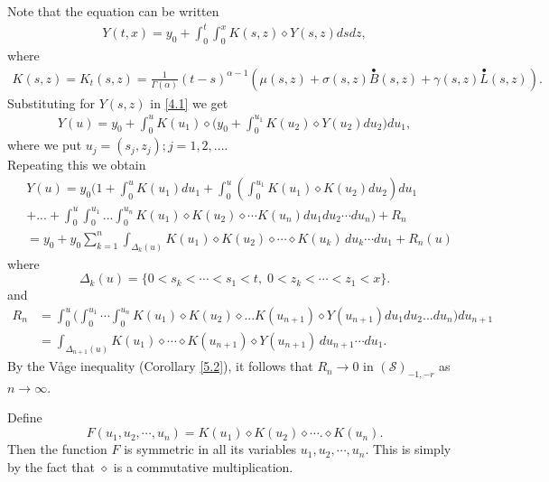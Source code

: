 \documentclass[12pt]{article}%
\numberwithin{equation}{section}
\def\d{\diamond}
\def\d{\diamond}
\begin{document}
Note that the equation can be written
\begin{align}
Y(t,x)=y_0 + \int_0^t \int_0^x K(s,z) \diamond Y(s,z) ds dz, \label{4.1}
\end{align}
where
\begin{align}
K(s,z)=K_t(s,z)=\frac{1}{\Gamma(\alpha)}(t-s)^{\alpha -1}(\mu(s,z) +\sigma(s,z)\overset{\bullet}{B}(s,z)  + \gamma(s,z) \overset{\bullet}{L}(s,z)).\label{4.2}
\end{align}
Substituting for $Y(s,z)$ in \eqref{4.1} we get
\begin{align*}
Y(u)= y_0 + \int_0^{u} K(u_1) \d \big(y_0+ \int_0^{u_1}K(u_2)\d Y(u_2)du_2\big)du_1,
\end{align*}
where we put  $u_j=(s_j,z_j); j=1,2, ...$.\\ 
Repeating this we obtain
\begin{align}
&Y(u)=y_0\Big( 1 + \int_0^{u} K(u_1)du_1 + \int_0^{u} (\int_0^{u_1} K(u_1) \d K(u_2)du_2 ) du_1 \nonumber\\
& +  ... + \int_0^{u}  \int_0^{u_1} ... \int_0^{u_n} K(u_1)\d K(u_2) \d \cdots K(u_{n}) du_1 du_2 \cdots du_n) +R_{n} \label{4.5}\\
&=y_0
+y_0
\sum_{k=1}^{n}
\int_{\Delta_k(u)}
K(u_1)\diamond K(u_2)\diamond\cdots\diamond K(u_k)
\,du_k\cdots du_1
+
R_n(u)
\end{align}
where
\[
\Delta_k(u)
=
\{0<s_k<\cdots<s_1<t,\; 0<z_k<\cdots<z_1<x\}.
\]
and 
\begin{align}
R_{n}&= \int_0^{u} \big( \int_0^{u_1}\cdots \int_0^{u_n} K(u_1)\d K(u_2) \d ... K(u_{n+1}) \d Y(u_{n+1})du_1 du_2 ...du_n \big) du_{n+1}\\
&=\int_{\Delta_{n+1}(u)}
K(u_1)\diamond\cdots\diamond K(u_{n+1})
\diamond Y(u_{n+1})
\,du_{n+1}\cdots du_1.
\end{align}
By the V\r{a}ge inequality (Corollary \ref{5.2}), it follows that $R_{n} \rightarrow 0$ in $(\mathcal{S})_{-1,-r}$ as $n \rightarrow \infty$.

Define 
$$F(u_1,u_2,\cdots, u_n)=K(u_1)\diamond K(u_2) \diamond \cdots. \diamond K(u_n).$$
Then the function $F$ is symmetric in all its variables $u_1, u_2,\cdots, u_n$.
This is simply by the fact that $\diamond$ is a commutative multiplication.
\\
\end{document}
